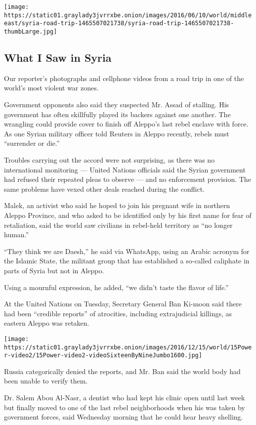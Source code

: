 \texttt{[image: https://static01.graylady3jvrrxbe.onion/images/2016/06/10/world/middleeast/syria-road-trip-1465507021738/syria-road-trip-1465507021738-thumbLarge.jpg]}

\hypertarget{what-i-saw-in-syria}{%
\subsection{What I Saw in Syria}\label{what-i-saw-in-syria}}

Our reporter's photographs and cellphone videos from a road trip in one
of the world's most violent war zones.

Government opponents also said they suspected Mr. Assad of stalling. His
government has often skillfully played its backers against one another.
The wrangling could provide cover to finish off Aleppo's last rebel
enclave with force. As one Syrian military officer told Reuters in
Aleppo recently, rebels must ``surrender or die.''

Troubles carrying out the accord were not surprising, as there was no
international monitoring --- United Nations officials said the Syrian
government had refused their repeated pleas to observe --- and no
enforcement provision. The same problems have vexed other deals reached
during the conflict.

Malek, an activist who said he hoped to join his pregnant wife in
northern Aleppo Province, and who asked to be identified only by his
first name for fear of retaliation, said the world saw civilians in
rebel-held territory as ``no longer human.''

``They think we are Daesh,'' he said via WhatsApp, using an Arabic
acronym for the Islamic State, the militant group that has established a
so-called caliphate in parts of Syria but not in Aleppo.

Using a mournful expression, he added, ``we didn't taste the flavor of
life.''

At the United Nations on Tuesday, Secretary General Ban Ki-moon said
there had been ``credible reports'' of atrocities, including
extrajudicial killings, as eastern Aleppo was retaken.

\texttt{[image: https://static01.graylady3jvrrxbe.onion/images/2016/12/15/world/15Power-video2/15Power-video2-videoSixteenByNineJumbo1600.jpg]}

Russia categorically denied the reports, and Mr. Ban said the world body
had been unable to verify them.

Dr. Salem Abou Al-Nasr, a dentist who had kept his clinic open until
last week but finally moved to one of the last rebel neighborhoods when
his was taken by government forces, said Wednesday morning that he could
hear heavy shelling.

